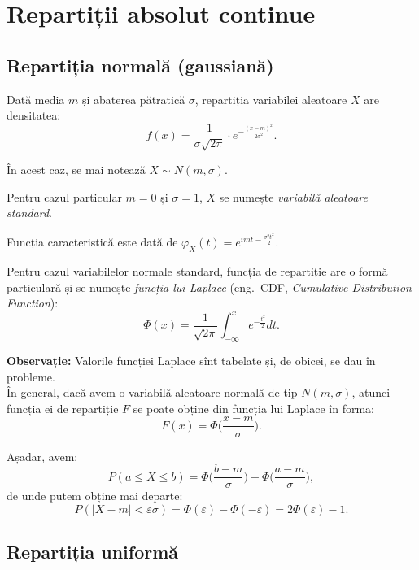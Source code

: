 
\section{Repartiții absolut continue}

\subsection{Repartiția normală (gaussiană)}

\indent\indent Dată media $ m $ și abaterea pătratică $ \sigma $, repartiția
variabilei aleatoare $ X $ are densitatea:
\[
  f(x) = \frac{1}{\sigma \sqrt{2\pi}} \cdot e^{-\frac{(x - m)^2}{2\sigma^2}}.
\]

În acest caz, se mai notează $ X \sim N(m, \sigma) $.

Pentru cazul particular $ m = 0 $ și $ \sigma = 1 $, $ X $ se numește
\emph{variabilă aleatoare standard}.

Funcția caracteristică este dată de $ \varphi_X(t) = e^{imt - \frac{\sigma^2 t^2}{2}}. $

Pentru cazul variabilelor normale standard, funcția de repartiție are o formă
particulară și se numește \emph{funcția lui Laplace} (eng.\ CDF, \emph{Cumulative
Distribution Function}):
\[
  \Phi(x) = \frac{1}{\sqrt{2\pi}} \int_{-\infty}^x e^{-\frac{t^2}{2}} dt.
\]

\textbf{Observație:} Valorile funcției Laplace sînt tabelate și, de obicei,
se dau în probleme. \\

În general, dacă avem o variabilă aleatoare normală de tip $ N(m, \sigma) $, atunci
funcția ei de repartiție $ F $ se poate obține din funcția lui Laplace în forma:
\[
  F(x) = \Phi \Big( \frac{x - m}{\sigma} \Big).
\]

Așadar, avem:
\begin{equation}
  \label{eq:p-phi-lap}
  P(a \leq X \leq b) = \Phi \Big( \frac{b - m}{\sigma} \Big) - \Phi \Big( \frac{a - m}{\sigma} \Big),
\end{equation}
de unde putem obține mai departe:
\[
  P(|X - m| < \varepsilon \sigma) = \Phi(\varepsilon) - \Phi(-\varepsilon) = %
  2 \Phi(\varepsilon) - 1.
\]



\subsection{Repartiția uniformă}

